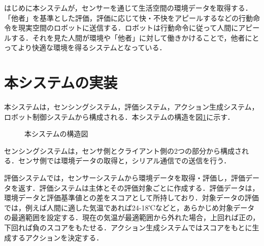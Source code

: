 \documentclass[paper=a4paper,jafontsize=9pt,head_space=15mm,gutter=20mm,
twocolumn,number_of_lines=49, line_length=26zw]{myuarticle}
\begin{document}
はじめに本システムが，センサーを通じて生活空間の環境データを取得する．「他者」を基準とした評価，評価に応じて快・不快をアピールするなどの行動命令を現実空間のロボットに送信する．ロボットは行動命令に従って人間にアピールする．それを見た人間が環境や「他者」に対して働きかけることで，他者にとってより快適な環境を得るシステムとなっている．

\section{本システムの実装}
本システムは，センシングシステム，評価システム，アクション生成システム，ロボット制御システムから構成される．本システムの構造を図\ref{fig:system-structure}に示す．

\fboxsep=0pt            %
\fboxrule=1pt            %
\begin{figure}[h]
  \centering
  \caption{本システムの構造図}
  \label{fig:system-structure}
\end{figure}

センシングシステムは，センサ側とクライアント側の2つの部分から構成される．センサ側では環境データの取得と，シリアル通信での送信を行う．

評価システムでは，センサーシステムから環境データを取得・評価し，評価データを返す．評価システムは主体とその評価対象ごとに作成する．評価データは，環境データと評価基準値との差をスコアとして所持しており．対象データの評価では，例えば人間に適した気温であれば24-18℃などと，あらかじめ対象データの最適範囲を設定する．現在の気温が最適範囲から外れた場合，上回れば正の，下回れば負のスコアをもたせる．アクション生成システムではスコアをもとに生成するアクションを決定する．
\end{document}

